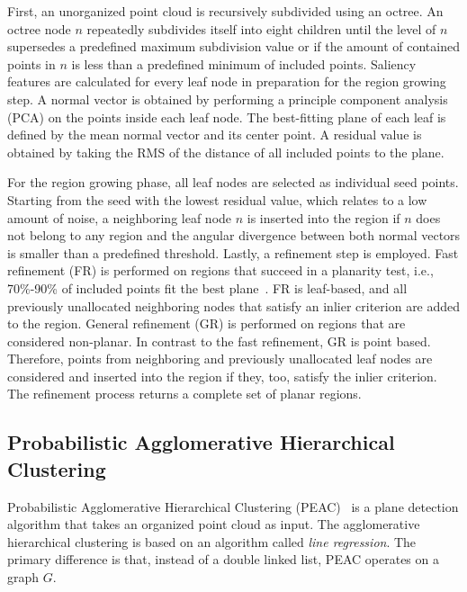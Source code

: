 \documentclass[main.tex]{subfiles}
\begin{document}
First, an unorganized point cloud is recursively subdivided using an octree.
An octree node $n$ repeatedly subdivides itself into eight children until the level of $n$ supersedes a predefined maximum subdivision value or if the
amount of contained points in $n$ is less than a predefined minimum of included points.
Saliency features are calculated for every leaf node in preparation for the region growing step. A normal vector is obtained by performing a principle
component analysis (PCA) on the points inside each leaf node. The best-fitting plane of each leaf is defined by the mean normal vector and its center point.
A residual value is obtained by taking the RMS of the distance of all included points to the plane.

For the region growing phase, all leaf nodes are selected as individual seed points. Starting from the seed with the lowest residual value, which relates to a low amount of noise,
a neighboring leaf node $n$ is inserted into the region if $n$ does not belong to any region and the angular divergence between both normal vectors is smaller than
a predefined threshold.
Lastly, a refinement step is employed.
Fast refinement (FR) is performed on regions that succeed in a planarity test, i.e., 70\%-90\% of included points fit the best plane~\cite[Section~3.4]{Vo_Truong-Hong_Laefer_Bertolotto_2015}. FR is leaf-based, and all previously unallocated neighboring nodes that satisfy an inlier criterion are added to the region.
General refinement (GR) is performed on regions that are considered non-planar. In contrast to the fast refinement, GR is point based. Therefore,
points from neighboring and previously unallocated leaf nodes are considered and inserted into the region if they, too, satisfy the inlier criterion.
The refinement process returns a complete set of planar regions.

\subsection{Probabilistic Agglomerative Hierarchical Clustering}
\label{subsec:bg-peac}
Probabilistic Agglomerative Hierarchical Clustering (PEAC)~\cite{Feng_Taguchi_Kamat_2014} is a plane detection algorithm that takes an organized
point cloud as input.
The agglomerative hierarchical clustering is based on an algorithm called
\textit{line regression}\cite[Section~III.B]{Nguyen_Martinelli_Tomatis_Siegwart_2005}. The primary difference is
that, instead of a double linked list, PEAC operates on a graph $G$.
\end{document}
